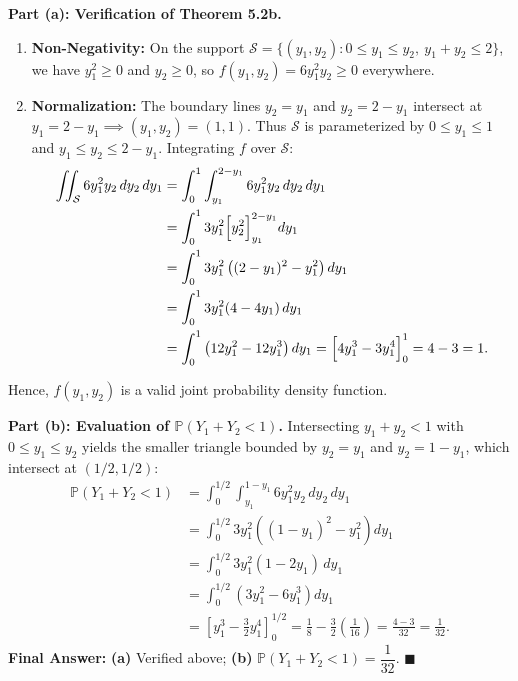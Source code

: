 \documentclass[11pt, letterpaper]{article}
\theoremstyle{definition}
\theoremstyle{remark}
\begin{document}
\textbf{Part (a): Verification of Theorem 5.2b.}
\begin{enumerate}[label=\arabic*.]
    \item \textbf{Non-Negativity:} On the support $\mathcal{S} = \{(y_1, y_2) : 0 \le y_1 \le y_2,\ y_1 + y_2 \le 2\}$, we have $y_1^2 \ge 0$ and $y_2 \ge 0$, so $f(y_1, y_2) = 6y_1^2 y_2 \ge 0$ everywhere.
    \item \textbf{Normalization:} The boundary lines $y_2 = y_1$ and $y_2 = 2 - y_1$ intersect at $y_1 = 2 - y_1 \implies (y_1, y_2) = (1, 1)$. Thus $\mathcal{S}$ is parameterized by $0 \le y_1 \le 1$ and $y_1 \le y_2 \le 2 - y_1$. Integrating $f$ over $\mathcal{S}$:
    \begin{align*}
        \iint_{\mathcal{S}} 6 y_1^2 y_2 \, dy_2 \, dy_1 
        &= \int_{0}^{1} \int_{y_1}^{2 - y_1} 6 y_1^2 y_2 \, dy_2 \, dy_1 \\
        &= \int_{0}^{1} 3 y_1^2 \Bigl[ y_2^2 \Bigr]_{y_1}^{2 - y_1} dy_1 \\
        &= \int_{0}^{1} 3 y_1^2 \left( (2 - y_1)^2 - y_1^2 \right) dy_1 \\
        &= \int_{0}^{1} 3 y_1^2 (4 - 4y_1) \, dy_1 \\
        &= \int_{0}^{1} \left( 12 y_1^2 - 12 y_1^3 \right) dy_1 = \Bigl[ 4 y_1^3 - 3 y_1^4 \Bigr]_{0}^{1} = 4 - 3 = 1.
    \end{align*}
\end{enumerate}
Hence, $f(y_1, y_2)$ is a valid joint probability density function.

\textbf{Part (b): Evaluation of $\mathbb{P}(Y_1 + Y_2 < 1)$.}
Intersecting $y_1 + y_2 < 1$ with $0 \le y_1 \le y_2$ yields the smaller triangle bounded by $y_2 = y_1$ and $y_2 = 1 - y_1$, which intersect at $(1/2, 1/2)$:
\begin{align*}
    \mathbb{P}(Y_1 + Y_2 < 1) &= \int_{0}^{1/2} \int_{y_1}^{1 - y_1} 6 y_1^2 y_2 \, dy_2 \, dy_1 \\
    &= \int_{0}^{1/2} 3 y_1^2 \left( (1 - y_1)^2 - y_1^2 \right) dy_1 \\
    &= \int_{0}^{1/2} 3 y_1^2 (1 - 2y_1) \, dy_1 \\
    &= \int_{0}^{1/2} \left( 3 y_1^2 - 6 y_1^3 \right) dy_1 \\
    &= \left[ y_1^3 - \frac{3}{2} y_1^4 \right]_{0}^{1/2} = \frac{1}{8} - \frac{3}{2}\left(\frac{1}{16}\right) = \frac{4 - 3}{32} = \frac{1}{32}.
\end{align*}
\textbf{Final Answer:} \textbf{(a)} Verified above; \quad \textbf{(b)} $\mathbb{P}(Y_1 + Y_2 < 1) = \dfrac{1}{32}$. $\blacksquare$
\end{document}
